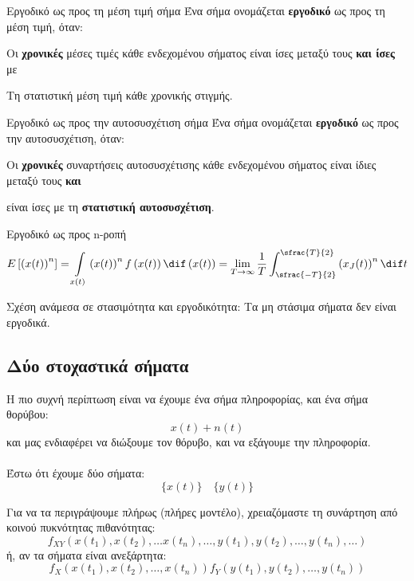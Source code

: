 \documentclass[11pt,a4paper,notitlepage,fleqn,final]{article}
\begin{document}
\begin{defn}{Εργοδικό ως προς τη μέση τιμή σήμα}{}
	Ένα σήμα ονομάζεται \textbf{εργοδικό} ως προς τη μέση τιμή, όταν:
	\begin{enumparen}
		\item Οι \textbf{χρονικές} μέσες τιμές κάθε ενδεχομένου σήματος
		είναι ίσες μεταξύ τους \textbf{και ίσες} με
		\item Τη στατιστική μέση τιμή κάθε χρονικής στιγμής.
	\end{enumparen}
\end{defn}

\begin{defn}{Εργοδικό ως προς την αυτοσυσχέτιση σήμα}{}
	Ένα σήμα ονομάζεται \textbf{εργοδικό} ως προς την αυτοσυσχέτιση,
	όταν:
	\begin{enumparen}
		\item Οι \textbf{χρονικές} συναρτήσεις αυτοσυσχέτισης
		κάθε ενδεχομένου σήματος
		είναι ίδιες μεταξύ τους \textbf{και}
		\item είναι ίσες με τη \textbf{στατιστική αυτοσυσχέτιση}.
	\end{enumparen}
\end{defn}

\begin{defn}{Εργοδικό ως προς n-ροπή}{}
	\[
	E\left[\left(x(t)\right)^n\right] =
	\int\limits_{x(t)} \left(x(t)\right)^n
	f\left(x(t)\right) \dif\left(x(t)\right)
	= \lim_{T\to \infty} \frac{1}{T}
	\int_{\sfrac{-T}{2} }^{\sfrac{T}{2} }
	\left(x_J(t)\right)^n \dif t
	\]
\end{defn}

Σχέση ανάμεσα σε στασιμότητα και εργοδικότητα:
Τα μη στάσιμα σήματα δεν είναι εργοδικά.

\subsection{Δύο στοχαστικά σήματα}
Η πιο συχνή περίπτωση είναι να έχουμε ένα σήμα πληροφορίας, και ένα
σήμα θορύβου:
\[
x(t) + n(t)
\]
και μας ενδιαφέρει να διώξουμε τον θόρυβο, και να εξάγουμε την
πληροφορία.

\paragraph{}
Έστω ότι έχουμε δύο σήματα:
\[
\big\lbrace x(t) \big\rbrace \quad
\big\lbrace y(t) \big\rbrace
\]

Για να τα περιγράψουμε πλήρως (πλήρες μοντέλο),
χρειαζόμαστε τη συνάρτηση από κοινού πυκνότητας πιθανότητας:
\[
f_{XY} \left(
x(t_1),x(t_2),\dots x(t_n),\dots,
y(t_1),y(t_2),\dots,y(t_n),\dots
\right)
\]
ή, αν τα σήματα είναι ανεξάρτητα:
\[
f_X\left(x(t_1),x(t_2),\dots,x(t_n)\right)
f_Y\left(y(t_1),y(t_2),\dots,y(t_n)\right)
\]
\end{document}
